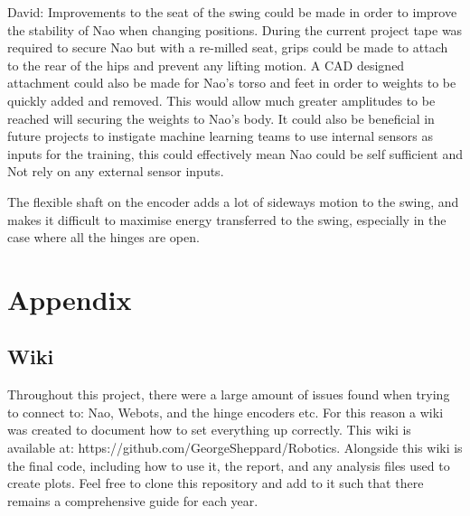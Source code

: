 \documentclass[11pt]{article}
\newcommand*\ruleline[1]{\par\noindent\raisebox{.8ex}{\makebox[\linewidth]{\hrulefill\hspace{1ex}\raisebox{-.8ex}{#1}\hspace{1ex}\hrulefill}}}
\begin{document}
David: Improvements to the seat of the swing could be made in order to improve the stability of Nao when changing positions. During the current project tape was required to secure Nao but with a re-milled seat, grips could be made to attach to the rear of the hips and prevent any lifting motion. A CAD designed attachment could also be made for Nao's torso and feet in order to weights to be quickly added and removed. This would allow much greater amplitudes to be reached will securing the weights to Nao's body. It could also be beneficial in future projects to instigate machine learning teams to use internal sensors as inputs for the training, this could effectively mean Nao could be self sufficient and Not rely on any external sensor inputs.

The flexible shaft on the encoder adds a lot of sideways motion to the swing, and makes it difficult to maximise energy transferred to the swing, especially in the case where all the hinges are open. 
\appendix
\section{Appendix}
\subsection{Wiki} \label{sec:wiki}
\ruleline{George Sheppard}
Throughout this project, there were a large amount of issues found when trying to connect to: Nao, Webots, and the hinge encoders etc. For this reason a wiki was created to document how to set everything up correctly. This wiki is available at: https://github.com/GeorgeSheppard/Robotics. Alongside this wiki is the final code, including how to use it, the report, and any analysis files used to create plots. Feel free to clone this repository and add to it such that there remains a comprehensive guide for each year.
\end{document}
